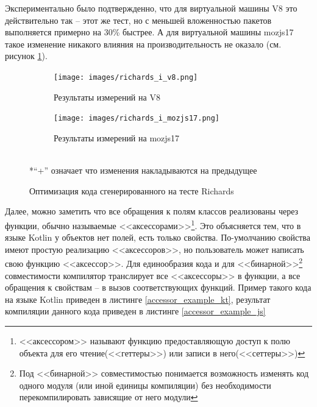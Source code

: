 Экспериментально было подтвержденно, что для виртуальной машины V8 это действительно так -- этот же тест, но с меньшей вложенностью пакетов выполняется примерно на 30\% быстрее. А для виртуальной машины mozjs17 такое изменение никакого влияния на производительность не оказало (см. рисунок \ref{richards_i}).

\begin{figure}[ht!]
\centering
	\begin{subfigure}[b]{0.7\textwidth}
	\centering
	\texttt{[image: images/richards\_i\_v8.png]}
	\caption{Результаты измерений на V8}
    \end{subfigure}

  	\begin{subfigure}[b]{0.7\textwidth}
	\centering
	\texttt{[image: images/richards\_i\_mozjs17.png]}
	\caption{Результаты измерений на mozjs17}
    \end{subfigure}
\\*``+'' означает что изменения накладываются на предыдущее
\caption{Оптимизация кода сгенерированного на тесте Richards}
\label{richards_i}
\end{figure}


Далее, можно заметить что все обращения к полям классов реализованы через функции, обычно называемые <<аксессорами>>\footnote{<<аксессором>> называют функцию предоставляющую доступ к полю объекта для его чтение(<<геттеры>>) или записи в него(<<сеттеры>>)}. Это объясняется тем, что в языке Kotlin у объектов нет полей, есть только свойства. По-умолчанию свойства имеют простую реализацию <<аксессоров>>, но пользователь может написать свою функцию <<аксессор>>. Для единообразия кода и для <<бинарной>>\footnote{Под <<бинарной>> совместимостью понимается возможность изменять код одного модуля (или иной единицы компиляции) без необходимости перекомпилировать зависящие от него модули}
совместимости компилятор транслирует все <<аксессоры>> в функции, а все обращения к свойствам -- в вызов соответствующих функций. Пример такого кода на языке Kotlin приведен в листинге \ref{accessor_example_kt}, результат компиляции данного кода приведен в листинге \ref{accessor_example_js}

\begin{code}
\end{code}

